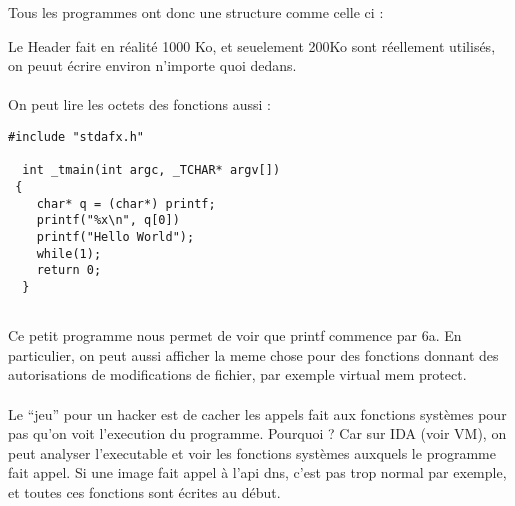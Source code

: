 \documentclass[a4paper,10pt]{article}
\begin{document}
Tous les programmes ont donc une structure comme celle ci : 


\begin{center}
\end{center}

Le Header fait en réalité 1000 Ko, et seuelement 200Ko sont réellement utilisés, on peuut écrire environ n'importe quoi dedans.

\paragraph*{}
On peut lire les octets des fonctions aussi : 

\begin{lstlisting}
#include "stdafx.h"
  
  int _tmain(int argc, _TCHAR* argv[])
 {
    char* q = (char*) printf;
    printf("%x\n", q[0])
    printf("Hello World");
    while(1);
    return 0;
  }
 
\end{lstlisting}

Ce petit programme nous permet de voir que printf commence par 6a. En particulier, on peut aussi afficher la meme chose pour des fonctions donnant des autorisations de modifications de fichier, par exemple virtual mem protect. 

\paragraph*{}
Le ``jeu'' pour un hacker est de cacher les appels fait aux fonctions systèmes pour pas qu'on voit l'execution du programme. 
Pourquoi ? Car sur IDA (voir VM), on peut analyser l'executable et voir les fonctions systèmes auxquels le programme fait appel. Si une image fait appel à l'api dns, c'est pas trop normal par exemple, et toutes ces fonctions sont écrites au début.
\end{document}
